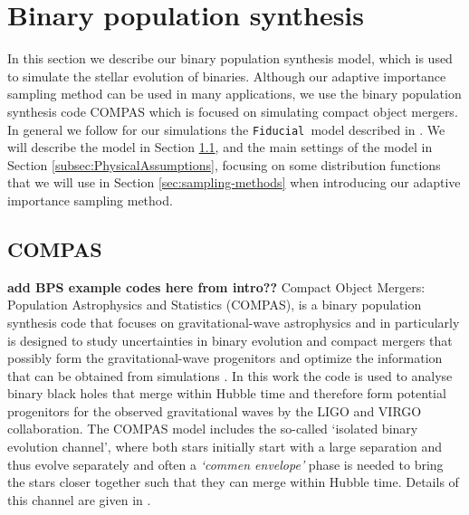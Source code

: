 \documentclass[a4paper,fleqn,usenatbib]{mnras}
\newcommand{\floor}[1]{\textbf{\textcolor{ochre}{#1}}}
\newcommand\Fiducial{\texttt{Fiducial }}
\begin{document}
\section{Binary population synthesis}
\label{sec:BPS}

In this section we describe our binary population synthesis model, which is used to simulate the stellar evolution of binaries. Although our adaptive importance sampling method can be used in many applications, we use the binary population synthesis code COMPAS which is focused on simulating compact object mergers.  In general we follow for our simulations the \Fiducial model described in \citep{vigna2018formation}.
 We will  describe the model in Section \ref{subsec:COMPAS}, and the  main settings of the model in Section \ref{subsec:PhysicalAssumptions}, focusing on some distribution functions that we will use in Section \ref{sec:sampling-methods} when introducing our adaptive importance sampling method. 



%
\subsection{ COMPAS}
\label{subsec:COMPAS}
%
\floor{add BPS example codes here from intro??}
Compact Object Mergers: Population Astrophysics and Statistics (COMPAS), is a binary population synthesis code that focuses on gravitational-wave astrophysics and in particularly is designed to study uncertainties in binary evolution and  compact mergers that possibly form the gravitational-wave progenitors  and optimize the information that can be obtained from simulations \citep{barrett2017accuracy}. In this work the code is used to analyse binary black holes that merge within Hubble time and therefore form potential progenitors for the observed gravitational waves by the LIGO and VIRGO collaboration. The COMPAS model includes the so-called `isolated binary evolution channel', where both stars initially start with a large separation and thus evolve separately and often a \emph{`commen envelope'} phase is needed to bring the stars closer together such that they can merge within Hubble time. Details of this channel are given in \citep{belczynski2016first}.   
\end{document}

